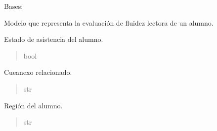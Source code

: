 \documentclass[letterpaper,10pt,spanish]{sphinxmanual}
\begin{document}
\begin{fulllineitems}

\pysigstartsignatures
{}
\pysigstopsignatures
\sphinxAtStartPar
Bases: 

\sphinxAtStartPar
Modelo que representa la evaluación de fluidez lectora de un alumno.


\begin{fulllineitems}

\pysigstartsignatures
{}
\pysigstopsignatures
\sphinxAtStartPar
Estado de asistencia del alumno.
\begin{quote}\begin{description}
\sphinxAtStartPar
bool

\end{description}\end{quote}

\end{fulllineitems}



\begin{fulllineitems}

\pysigstartsignatures
{}
\pysigstopsignatures
\sphinxAtStartPar
Cueanexo relacionado.
\begin{quote}\begin{description}
\sphinxAtStartPar
str

\end{description}\end{quote}

\end{fulllineitems}



\begin{fulllineitems}

\pysigstartsignatures
{}
\pysigstopsignatures
\sphinxAtStartPar
Región del alumno.
\begin{quote}\begin{description}
\sphinxAtStartPar
str

\end{description}\end{quote}


\end{fulllineitems}
\end{fulllineitems}
\end{document}
